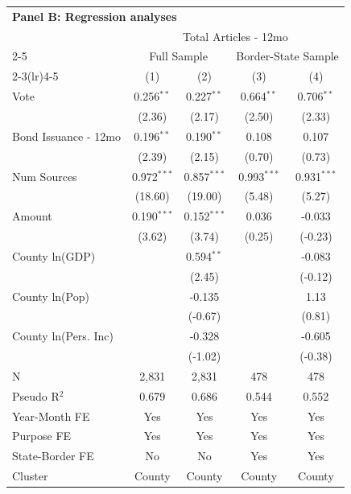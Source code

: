 \begingroup
\centering
\begin{tabular*}{\textwidth}{@{\extracolsep{\fill}}lcccc}
\multicolumn{5}{l}{\textbf{Panel B: Regression analyses}}\\

\addlinespace
   \toprule
    & \multicolumn{4}{c}{Total Articles - 12mo}\\
   \cmidrule(lr){2-5}
    & \multicolumn{2}{c}{Full Sample} & \multicolumn{2}{c}{Border-State Sample}\\
   \cmidrule(lr){2-3}\cmidrule(lr){4-5}
                        & (1)           & (2)           & (3)           & (4)\\  
   \midrule 
   Vote                 & 0.256$^{**}$  & 0.227$^{**}$  & 0.664$^{**}$  & 0.706$^{**}$\\   
                        & (2.36)        & (2.17)        & (2.50)        & (2.33)\\   
   Bond Issuance - 12mo & 0.196$^{**}$  & 0.190$^{**}$  & 0.108         & 0.107\\   
                        & (2.39)        & (2.15)        & (0.70)       & (0.73)\\   
   Num Sources          & 0.972$^{***}$ & 0.857$^{***}$ & 0.993$^{***}$ & 0.931$^{***}$\\   
                        & (18.60)        & (19.00)        & (5.48)        & (5.27)\\   
   Amount               & 0.190$^{***}$ & 0.152$^{***}$ & 0.036         & -0.033\\   
                        & (3.62)        & (3.74)        & (0.25)       & (-0.23)\\   
   County ln(GDP)       &               & 0.594$^{**}$  &               & -0.083\\   
                        &               & (2.45)        &               & (-0.12)\\   
   County ln(Pop)       &               & -0.135        &               & 1.13\\   
                        &               & (-0.67)      &               & (0.81)\\   
   County ln(Pers. Inc) &               & -0.328        &               & -0.605\\   
                        &               & (-1.02)       &               & (-0.38)\\   
   \hline
   N         & 2,831         & 2,831         & 478           & 478\\  
   Pseudo R$^2$         & 0.679         & 0.686         & 0.544         & 0.552\\  
   Year-Month FE        & Yes           & Yes           & Yes           & Yes\\  
   Purpose FE           & Yes           & Yes           & Yes           & Yes\\  
   State-Border FE      & No            & No            & Yes           & Yes\\  
   Cluster              & County & County & County & County\\  
   \bottomrule
\end{tabular*}
\par\endgroup
